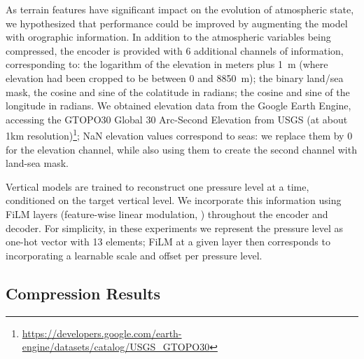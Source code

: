 \documentclass[11pt, a4paper, logo, copyright, numbering]{googledeepmind}
\begin{document}
As terrain features have significant impact on the evolution of atmospheric state, we hypothesized that performance could be improved by augmenting the model with orographic information.
In addition to the atmospheric variables being compressed, the encoder is provided with 6 additional channels of information, corresponding to: the logarithm of the elevation in meters plus 1~m (where elevation had been cropped to be between 0 and 8850~m); the binary land/sea mask, the cosine and sine of the colatitude in radians; the cosine and sine of the longitude in radians. We obtained elevation data from the Google Earth Engine, accessing the GTOPO30 Global 30 Arc-Second Elevation from USGS (at about 1km resolution)\footnote{\url{https://developers.google.com/earth-engine/datasets/catalog/USGS_GTOPO30}}; NaN elevation values correspond to seas: we replace them by 0 for the elevation channel, while also using them to create the second channel with land-sea mask.

Vertical models are trained to reconstruct one pressure level at a time, conditioned on the target vertical level.
We incorporate this information using FiLM layers (feature-wise linear modulation, \citet{perez2018film}) throughout the encoder and decoder.
For simplicity, in these experiments we represent the pressure level as one-hot vector with 13 elements; FiLM at a given layer then corresponds to incorporating a learnable scale and offset per pressure level.

\subsection{Compression Results}
\end{document}
